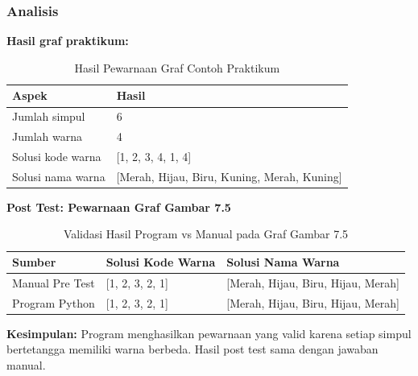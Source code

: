 \subsubsection*{Analisis}
\textbf{Hasil graf praktikum:}
\begin{table}[H]
    \centering
    \caption{Hasil Pewarnaan Graf Contoh Praktikum}
    \label{tab:praktikum7-hasil-praktikum}
    \begin{tabular}{ll}
    \toprule
    \textbf{Aspek} & \textbf{Hasil} \\ \midrule
    Jumlah simpul & 6 \\
    Jumlah warna & 4 \\
    Solusi kode warna & [1, 2, 3, 4, 1, 4] \\
    Solusi nama warna & [Merah, Hijau, Biru, Kuning, Merah, Kuning] \\ \bottomrule
    \end{tabular}
\end{table}

\textbf{Post Test: Pewarnaan Graf Gambar 7.5}
\begin{table}[H]
    \centering
    \caption{Validasi Hasil Program vs Manual pada Graf Gambar 7.5}
    \label{tab:praktikum7-validasi-posttest}
    \begin{tabular}{lll}
    \toprule
    \textbf{Sumber} & \textbf{Solusi Kode Warna} & \textbf{Solusi Nama Warna} \\ \midrule
    Manual Pre Test & [1, 2, 3, 2, 1] & [Merah, Hijau, Biru, Hijau, Merah] \\
    Program Python & [1, 2, 3, 2, 1] & [Merah, Hijau, Biru, Hijau, Merah] \\ \bottomrule
    \end{tabular}
\end{table}

\textbf{Kesimpulan:} Program menghasilkan pewarnaan yang valid karena setiap simpul bertetangga memiliki warna berbeda. Hasil post test sama dengan jawaban manual.
